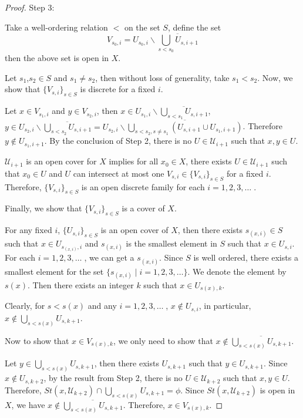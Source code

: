 \documentclass[12pt,oneside,english]{amsbook}
\numberwithin{equation}{section} %
\numberwithin{figure}{section} %
\theoremstyle{plain}
\numberwithin{section}{chapter}
\theoremstyle{plain}
\begin{document}
\begin{proof}
  Step 3:

  Take a well-ordering relation $<$ on the set $S$, define the set $$V_{s_{0},i} = U_{s_{0},i} \backslash \overline{\bigcup_{s < s_{0}}U_{s, i+1}}$$
  then the above set is open in $X$.

  Let $s_{1}$,$s_{2} \in S$ and $s_{1} \neq s_{2}$, then without loss of generality, take $s_{1} < s_{2}$. 
  Now, we show that $\{V_{s,i}\}_{s \in S}$ is discrete for a fixed $i$.

  Let $x \in V_{s_{1},i}$ and $y \in V_{s_{2},i}$, then $x \in U_{s_{1},i} \backslash \overline{\bigcup_{s < s_{1}} U_{s, i+1}}$, $y \in U_{s_{2},i} \backslash \overline{\bigcup_{s < s_{2}}U_{s, i+1}} = U_{s_{2},i} \backslash \overline{\bigcup_{s < s_{2}, s \neq s_{1}}(U_{s,i+1} \cup U_{s_{1},i+1})}$. Therefore $y \notin U_{s_{1}, i+1}$. By the conclusion of Step 2, there is no $U \in \mathcal{U}_{i+1}$ such that $x,y \in U$.

  $\mathcal{U}_{i+1}$ is an open cover for $X$ implies for all $x_{0} \in X$, there exists $U \in \mathcal{U}_{i+1}$ such that $x_{0} \in U$ and $U$ can intersect at most one $V_{s,i} \in \{V_{s,i}\}_{s \in S}$ for a fixed $i$. Therefore, $\{V_{s,i}\}_{s \in S}$ is an open discrete family for each $i = 1,2,3, \ldots \;$.

  Finally, we show that $\{V_{s,i}\}_{s \in S}$ is a cover of $X$.

  For any fixed $i$, $\{U_{s,i}\}_{s \in S}$ is an open cover of $X$, then there exists $s_{(x, i)} \in S$ such that $x \in U_{s_{(x,i)},i}$ and $s_{(x,i)}$ is the smallest element in $S$ such that $x \in U_{s,i}$. For each $i = 1,2,3, \ldots \;$, we can get a $s_{(x, i)}$. Since $S$ is well ordered, there exists a smallest element for the set $\{s_{(x,i)} \; | \; i = 1,2,3, \ldots \}$. We denote the element by $s(x)$. Then there exists an integer $k$ such that $x \in U_{s(x),k}$.

  Clearly, for $s < s(x)$ and any $i = 1,2,3, \ldots \;$, $x \notin U_{s,i}$, in particular, $x \notin \bigcup_{s < s(x)}U_{s, k+1}$.

  Now to show that $x \in V_{s(x),k}$, 
  we only need to show that $x \notin \overline{\bigcup_{s < s(x)}U_{s, k+1}}$.

  Let $y \in \bigcup_{s < s(x)}U_{s, k+1}$, then there exists $U_{s, k+1}$ such that $y \in U_{s, k+1}$. Since $x \notin U_{s,k+2}$, by the result from Step 2, there is no $U \in \mathcal{U}_{k+2}$ such that $x,y \in U$. Therefore, $St(x, \mathcal{U}_{k+2}) \cap \bigcup_{s<s(x)}U_{s,k+1} = \phi$. Since $St(x, \mathcal{U}_{k+2})$ is open in $X$, we have $x \notin \overline{\bigcup_{s < s(x)}U_{s,k+1}}$. Therefore, $x \in V_{s(x),k}$.
\end{proof}
\end{document}
